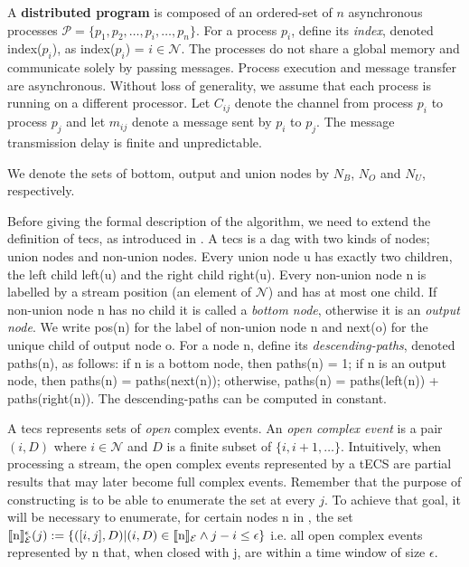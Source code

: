 A \textbf{distributed program} is composed of an ordered-set of $n$ asynchronous processes $\mathcal{P} = \{ p_{1}, p_{2}, \ldots, p_{i}, \ldots, p_{n}\}$. For a process $p_{i}$, define its \emph{index}, denoted index($p_{i}$), as index($p_{i}$) = $i \in \mathcal{N}$. The processes do not share a global memory and communicate solely by passing messages. Process execution and message transfer are asynchronous. Without loss of generality, we assume that each process is running on a different processor. Let $C_{ij}$ denote the channel from process $p_{i}$ to process $p_{j}$ and let $m_{ij}$ denote a message sent by $p_{i}$ to $p_{j}$. The message transmission delay is finite and unpredictable.



We denote the sets of bottom, output and union nodes by $N_{B}$, $N_{O}$ and $N_{U}$, respectively.


Before giving the formal description of the algorithm, we need to extend the definition of \acrfull{tecs}, as introduced in \cite{core}. A \acrshort{tecs} is a \acrfull{dag} \tecs with two kinds of nodes; union nodes and non-union nodes. Every union node u has exactly two children, the left child left(u) and the right child right(u). Every non-union node n is labelled by a stream position (an element of $\mathcal{N}$) and has at most one child. If non-union node n has no child it is called a \emph{bottom node}, otherwise it is an \emph{output node}. We write pos(n) for the label of non-union node n and next(o) for the unique child of output node o. For a node n, define its \emph{descending-paths}, denoted paths(n), as follows: if n is a bottom node, then paths(n) = 1; if n is an output node, then paths(n) = paths(next(n)); otherwise, paths(n) = paths(left(n)) + paths(right(n)). The descending-paths can be computed in constant.

A \acrshort{tecs} represents sets of \emph{open} complex events. An \emph{open complex event} is a pair $(i, D)$ where $i \in \mathcal{N}$ and $D$ is a finite subset of $\{i, i+1, \ldots\}$. Intuitively, when processing a stream, the open complex events represented by a tECS are partial results that may later become full complex events. Remember that the purpose of constructing \tecs is to be able to enumerate the set \enumCEA at every $j$. To achieve that goal, it will be necessary to enumerate, for certain nodes n in \tecs, the set $\llbracket \text{n} \rrbracket^{\epsilon}_{\mathcal{E}}(j) := \{ ([i, j], D) | (i, D) \in \llbracket \text{n} \rrbracket_{\mathcal{E}} \land j - i \leq \epsilon \}$ i.e. all open complex events represented by n that, when closed with j, are within a time window of size $\epsilon$.

